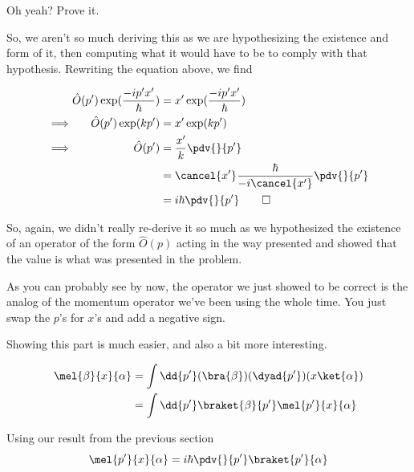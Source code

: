 \begin{answer}
\begin{answerpart}{Oh yeah?  Prove it.}
\begin{answerspart}
      So, we aren't so much deriving this as we are hypothesizing the
      existence and form of it, then computing what it would have to
      be to comply with that hypothesis.  Rewriting the equation
      above, we find

      \begin{equation}
        \begin{alignedat}{2}
          & &
          \hat{O}(p')\exp(\frac{-ip'x'}{\hbar})
          &= x'\exp(\frac{-ip'x'}{\hbar})\\
          \implies & &
          \hat{O}(p')\exp(kp')
          &= x'\exp(kp')\\
          \implies & &
          \hat{O}(p') &= \frac{x'}{k}\pdv{}{p'}\\
          & & &= \cancel{x'}\frac{\hbar}{-i\cancel{x'}}\pdv{}{p'}\\
          & & &= i\hbar\pdv{}{p'}\qed\\
        \end{alignedat}
      \end{equation}

      So, again, we didn't really re-derive it so much as we
      hypothesized the existence of an operator of the form
      $\hat{O}(p)$ acting in the way presented and showed that the
      value is what was presented in the problem.

      As you can probably see by now, the operator we just showed to
      be correct is the analog of the momentum operator we've been
      using the whole time.  You just swap the $p$'s for $x$'s and add
      a negative sign.
    \end{answerspart}

    \begin{answerspart}

      Showing this part is much easier, and also a bit more
      interesting.

      \begin{equation}
        \begin{split}
          \mel{\beta}{x}{\alpha}
          &= \int \dd{p'} (\bra{\beta})(\dyad{p'})(x\ket{\alpha})\\
          &= \int \dd{p'} \braket{\beta}{p'}\mel{p'}{x}{\alpha}\\
        \end{split}
      \end{equation}

      Using our result from the previous section
      \begin{equation}
        \mel{p'}{x}{\alpha} = i\hbar \pdv{}{p'}\braket{p'}{\alpha}
      \end{equation}


\end{answerspart}
\end{answerpart}
\end{answer}
